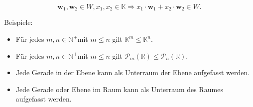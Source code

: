\documentclass[10pt]{article}
\begin{document}
\begin{equation*}
\mathbf{w}_{1}, \mathbf{w}_{2} \in W, x_{1}, x_{2} \in \mathbb{K} \Rightarrow x_{1} \cdot \mathbf{w}_{1}+x_{2} \cdot \mathbf{w}_{2} \in W . \tag{7.33}
\end{equation*}


Beispiele:

\begin{itemize}
  \item Für jedes $m, n \in \mathbb{N}^{+}$mit $m \leq n$ gilt $\mathbb{K}^{m} \leq \mathbb{K}^{n}$.
  \item Für jedes $m, n \in \mathbb{N}^{+}$mit $m \leq n$ gilt $\mathcal{P}_{m}(\mathbb{R}) \leq \mathcal{P}_{n}(\mathbb{R})$.
  \item Jede Gerade in der Ebene kann als Unterraum der Ebene aufgefasst werden.
  \item Jede Gerade oder Ebene im Raum kann als Unterraum des Raumes aufgefasst werden.
\end{itemize}
\end{document}
